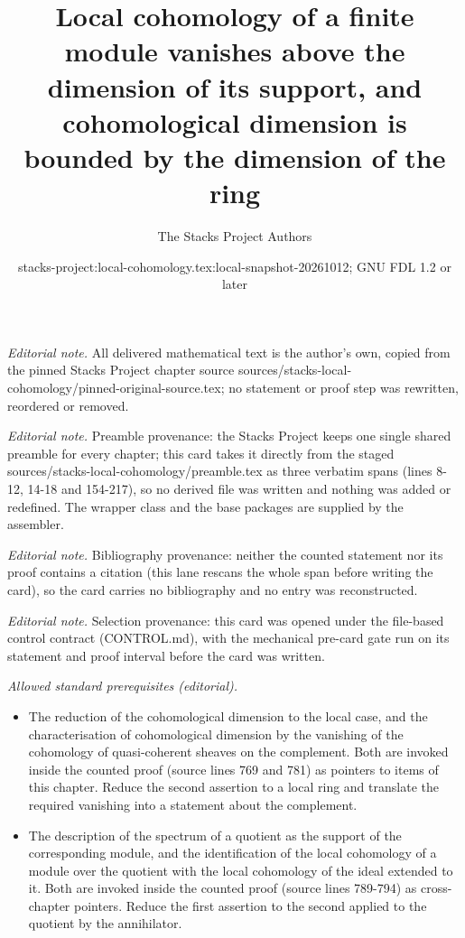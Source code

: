 \documentclass[10pt,a4paper]{amsart}
\title{Local cohomology of a finite module vanishes above the dimension of its support, and cohomological dimension is bounded by the dimension of the ring}
\author{The Stacks Project Authors}
\date{stacks-project:local-cohomology.tex:local-snapshot-20261012; GNU FDL 1.2 or later}
\theoremstyle{plain}
\theoremstyle{definition}
\theoremstyle{remark}
\numberwithin{equation}{subsection}
\begin{document}
\maketitle
\noindent\textit{Editorial note.} All delivered mathematical text is the author's own, copied from the pinned Stacks Project chapter source sources/stacks-local-cohomology/pinned-original-source.tex; no statement or proof step was rewritten, reordered or removed.\par\medskip
\noindent\textit{Editorial note.} Preamble provenance: the Stacks Project keeps one single shared preamble for every chapter; this card takes it directly from the staged sources/stacks-local-cohomology/preamble.tex as three verbatim spans (lines 8-12, 14-18 and 154-217), so no derived file was written and nothing was added or redefined. The wrapper class and the base packages are supplied by the assembler.\par\medskip
\noindent\textit{Editorial note.} Bibliography provenance: neither the counted statement nor its proof contains a citation (this lane rescans the whole span before writing the card), so the card carries no bibliography and no entry was reconstructed.\par\medskip
\noindent\textit{Editorial note.} Selection provenance: this card was opened under the file-based control contract (CONTROL.md), with the mechanical pre-card gate run on its statement and proof interval before the card was written.\par\medskip
\noindent\textit{Allowed standard prerequisites (editorial).}\begin{itemize}
\item The reduction of the cohomological dimension to the local case, and the characterisation of cohomological dimension by the vanishing of the cohomology of quasi-coherent sheaves on the complement. Both are invoked inside the counted proof (source lines 769 and 781) as pointers to items of this chapter. Reduce the second assertion to a local ring and translate the required vanishing into a statement about the complement.
\item The description of the spectrum of a quotient as the support of the corresponding module, and the identification of the local cohomology of a module over the quotient with the local cohomology of the ideal extended to it. Both are invoked inside the counted proof (source lines 789-794) as cross-chapter pointers. Reduce the first assertion to the second applied to the quotient by the annihilator.
\end{itemize}\medskip
\end{document}
